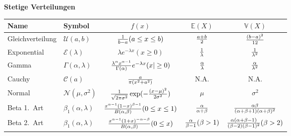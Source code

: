 {    \textbf{Stetige Verteilungen}\\
    \begin{tabular}{|l|l|c|c|c|}\hline
    Name & Symbol & $f(x)$ & $\mathbb E(X)$ & $\mathbb V(X)$ \\\hline
    Gleichverteilung\index{Gleichverteilung} & $\mathcal U(a,b)$ & ${1\over b-a} (a\le x\le b)$ & $a+b\over 2$ &
    $(b-a)^2\over 12$\\\hline
    Exponential\index{Exponentialverteilung} & $\mathcal E(\lambda)$ & $\lambda e^{-\lambda x} (x\ge 0)$ & $1\over\lambda$ & $1\over\lambda^2$ \\\hline
    Gamma\label{stetige_verteilung:gamma}\index{Gammaverteilung} & $\Gamma(\alpha,\lambda)$ &
    ${\lambda^\alpha x^{\alpha-1}\over\Gamma(\alpha)}e^{-\lambda x} (x|\ge 0)$ &
    $\alpha\over\lambda$ & $\alpha\over\lambda^2$\\\hline
    Cauchy\index{Cauchyverteilung} & $\mathcal C(a)$ & ${a\over\pi(x^2+a^2)}$ & N.A. & N.A.\\\hline
    Normal\index{Normalverteilung}\label{stetige_verteilung:normal}& $\mathcal N(\mu,\sigma^2)$ & ${1\over\sqrt{2\pi\sigma^2}}
    \exp(-{(x-\mu)^2\over 2\sigma^2})$ & $\mu$ & $\sigma^2$\\\hline
    Beta 1.\ Art\label{sec:betaverteilung_first}\label{stetige_verteilung:beta_first}\index{Betaverteilung (1.Art)}&$\beta_1(\alpha,\lambda)$&${x^{\alpha-1}
    (1-x)^{\beta-1}\over B(\alpha,\beta)}
     (0\le x\le 1)$&${\alpha\over\alpha+\beta}$&
    ${\alpha\beta\over(\alpha+\beta+1)(\alpha+\beta)^2}$\\\hline
    Beta 2.\ Art\index{Betaverteilung (2.Art)}&$\beta_1(\alpha,\lambda)$&${x^{\alpha-1}
    (1+x)^{-\alpha-\beta}\over B(\alpha,\beta)}
     (0\le x)$&${\alpha\over\beta-1} (\beta>1)$&
    ${\alpha(\alpha+\beta-1)\over(\beta-2)(\beta-1)^2}(\beta>2)$\\\hline
    \end{tabular}

    

}
